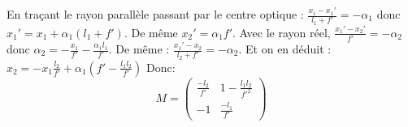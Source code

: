 \begin{Answer}

  En traçant le rayon parallèle passant par le centre optique :
  $\frac{x_1-x_1'}{l_1+f'}=-\alpha_1$ donc $x_1'=x_1+\alpha_1(l_1+f')$. De même
  $x_2'=\alpha_1f'$. Avec le rayon réel, $\frac{x_1'-x_2'}{f'}=-\alpha_2$ donc
  $\alpha_2=-\frac{x_1}{f'}- \frac{\alpha_1l_1}{f'}$. De même :
  $\frac{x_1'-x_2}{l_2+f'}=-\alpha_2$. Et on en déduit : $x_2 =-x_1
  \frac{l_2}{f'}+\alpha_1\left(f'-\frac{l_1l_2}{f'} \right)$ Donc:
  \[
M =
\begin{pmatrix}
  \frac{-l_2}{f'} & 1-\frac{l_1l_2}{f'^2}\\
  -1 & \frac{-l_1}{f'}
\end{pmatrix}
  \]

\end{Answer}
